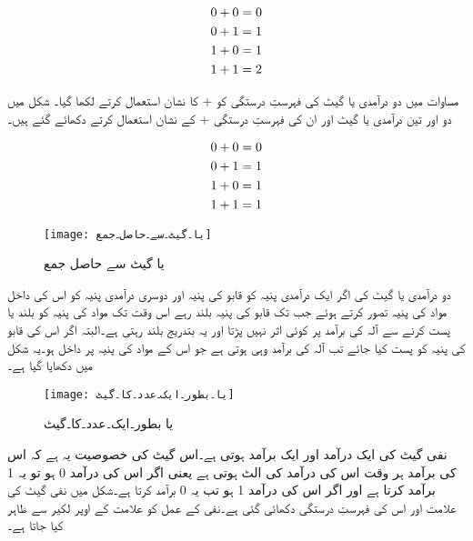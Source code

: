 \begin{align} \label{مساوات۔دو۔دہری۔اعداد۔کا۔مجموعہ}
0+0 &=0 \notag \\
0+1 &=1 \notag \\
1+0 &=1 \notag \\
1+1 &=2
\end{align}

مساوات  میں دو درآمدی یا گیٹ کی فہرستِ درستگی کو + کا نشان استعمال کرتے لکھا گیا۔
شکل   میں دو اور تین درآمدی یا گیٹ اور ان کی فہرستِ درستگی + کے نشان استعمال کرتے  دکھائے گئے ہیں۔


\begin{align} \label{مساوات۔یا۔گیٹ۔سے۔حاصل۔جمع}
0+0 &=0 \notag \\
0+1 &=1 \notag \\
1+0 &=1 \notag \\
1+1 &=1
\end{align}

\begin{figure}[th]
 \begin{center}
  \texttt{[image: یا۔گیٹ۔سے۔حاصل۔جمع]}
 \end{center}
\caption{یا گیٹ سے حاصل جمع}
\label{شکل۔یا۔گیٹ۔سے۔حاصل۔جمع}
\end{figure}

دو درآمدی یا گیٹ کی اگر ایک درآمدی پنیہ کو قابو کی پنیہ  اور دوسری درآمدی پنیہ کو اس کی داخل مواد کی پنیہ تصور کرتے ہوئے جب تک قابو کی پنیہ بلند رہے اس وقت تک مواد کی پنیہ کو بلند یا پست کرنے سے آلہ کی برآمد پر کوئی اثر نہیں پڑتا اور یہ بتدریج بلند رہتی ہے۔البتہ اگر اس کی قابو کی پنیہ کو پست کیا جائے تب آلہ کی برآمد وہی ہوتی ہے جو اس کے مواد کی پنیہ پر داخل ہو۔یہ شکل  میں دکھایا گیا ہے۔
 


\begin{figure}[th]
 \begin{center}
  \texttt{[image: یا۔بطور۔ایک۔عدد۔کا۔گیٹ]}
 \end{center}
\caption{یا بطور۔ایک۔عدد۔کا۔گیٹ}
\label{شکل۔یا۔بطور۔ایک۔عدد۔کا۔گیٹ}
\end{figure}

نفی گیٹ  کی ایک درآمد اور ایک برآمد ہوتی ہے۔اس گیٹ کی خصوصیت یہ ہے کہ اس کی برآمد ہر وقت اس کی درآمد کی الٹ ہوتی ہے یعنی اگر اس کی درآمد 0 ہو تو یہ 1 برآمد کرتا ہے اور اگر اس کی درآمد 1 ہو تب یہ 0 برآمد کرتا ہے۔شکل  میں نفی گیٹ کی علامت اور اس کی فہرستِ درستگی دکھائی گئی ہے۔نفی کے عمل کو علامت کے اوپر لکیر سے ظاہر کیا جاتا ہے۔

